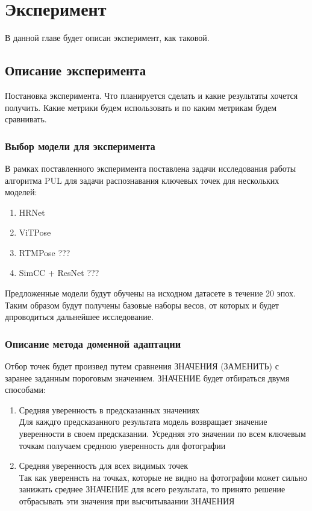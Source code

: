 \section{Эксперимент}
\label{sec:Chapter5} 

В данной главе будет описан эксперимент, как таковой.

\subsection{Описание эксперимента}

Постановка эксперимента. Что планируется сделать и какие результаты хочется получить. Какие метрики будем использовать и по каким метрикам будем сравнивать.

\subsubsection*{Выбор модели для эксперимента}

В рамках поставленного эксперимента поставлена задачи исследования работы алгоритма PUL для задачи распознавания ключевых точек для нескольких моделей:
\begin{enumerate}
\item HRNet
\item ViTPose
\item RTMPose ???
\item SimCC + ResNet ???
\end{enumerate}

Предложенные модели будут обучены на исходном датасете в течение 20 эпох. Таким образом будут получены базовые наборы весов, от которых и будет дпроводиться дальнейшее исследование.

\subsubsection*{Описание метода доменной адаптации}
Отбор точек будет произвед путем сравнения ЗНАЧЕНИЯ (ЗАМЕНИТЬ) с заранее заданным пороговым значением. ЗНАЧЕНИЕ будет отбираться двумя способами:
\begin{enumerate}
\item Средняя уверенность в предсказанных значениях\\
Для каждго предсказанного результата модель возвращает значение уверенности в своем предсказании. Усредняя это значении по всем ключевым точкам получаем среднюю уверенность для фотографии
\item Средняя уверенность для всех видимых точек\\
Так как увереннсть на точках, которые не видно на фотографии может сильно занижать среднее ЗНАЧЕНИЕ для всего результата, то принято решение отбрасывать эти значения при высчитываании ЗНАЧЕНИЯ
\end{enumerate}

